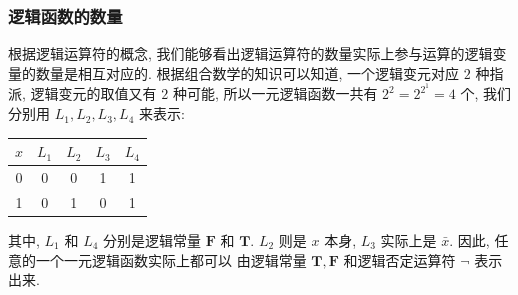 \documentclass[10pt,UTF8]{book} %
\begin{document}


\subsubsection{逻辑函数的数量}

根据逻辑运算符的概念, 我们能够看出逻辑运算符的数量实际上参与运算的逻辑变量的数量是相互对应的.
根据组合数学的知识可以知道, 一个逻辑变元对应 $2$ 种指派, 逻辑变元的取值又有 $2$ 种可能,
所以一元逻辑函数一共有 $2^2 = 2^{2^1}= 4$ 个, 我们分别用 $L_1, L_2, L_3, L_4$ 来表示:
{ %
\label{一元逻辑函数} %
\begin{longtable}{c|cccc}
    \toprule
    $x$ & $L_1$ & $L_2$ & $L_3$ & $L_4$ \\
    \midrule
    \endhead
    \bottomrule
    \endfoot

    0 & 0 & 0 & 1 & 1 \\
    1 & 0 & 1 & 0 & 1 \\
\end{longtable}}
其中, $L_1$ 和 $L_4$ 分别是逻辑常量 $\mathbf{F}$ 和 $\mathbf{T}$.
$L_2$ 则是 $x$ 本身, $L_3$ 实际上是 $\bar x$. 因此, 任意的一个一元逻辑函数实际上都可以
由逻辑常量 $\mathbf{T}, \mathbf{F}$ 和逻辑否定运算符 $\lnot$ 表示出来.
\end{document}
